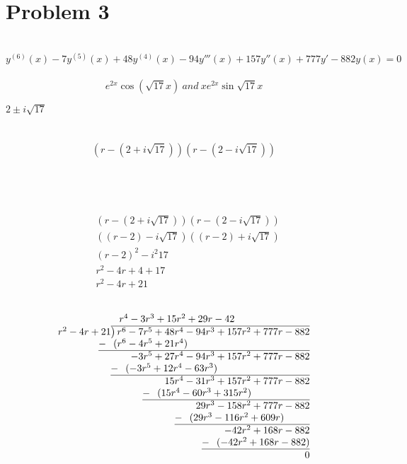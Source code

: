 \documentclass{article}
\begin{document}
    \newpage
    \section{Problem 3}
     \\
    $$y^{(6)}(x) -7y^{(5)}(x) + 48y^{(4)}(x) - 94y'''(x) + 157y''(x) + 777y' - 882y(x) = 0$$
     \\
    $$e^{2x}\cos(\sqrt{17}x)\ and\ xe^{2x}\sin{\sqrt{17}x}$$

    $2\pm i\sqrt{17}$
     \\ \\
     \\
    $$(r - (2 + i\sqrt{17}))(r - (2 - i\sqrt{17}))$$
     \\ \\ \\
     \\
    \begin{align*}
        &(r - (2 + i\sqrt{17}))(r - (2 - i\sqrt{17})) \\
        &((r - 2) - i\sqrt{17})((r - 2)+ i\sqrt{17}) \\
        &(r - 2)^{2} -i^{2}17\\
        &r^{2} - 4r + 4 + 17\\
        &r^{2} - 4r + 21\\
    \end{align*}
     \\
    \begin{align*}
        \begin{array}{r}
            r^{4} -3r^{3} + 15r^{2} + 29r - 42\phantom{)ddcddddddddddd} \\
            r^{2} - 4r + 21{\overline{\smash{\big)}\, r^{6}-7r^{5}+48r^{4}-94r^{3}+157r^{2}+777r-882}} \\
            \underline{-~\phantom{(}(r^{6} -4r^{5}+21r^{4})\phantom{-bbbbbbbbbbbbbbbbbbbbbbbbbb)}} \\
            -3r^{5} + 27r^{4} - 94r^{3} + 157r^{2} + 777r - 882 \phantom{}\\
            \underline{-~\phantom{(}(-3r^{5} + 12r^{4} - 63r^{3})\phantom{-bbbbbbbbbbbbbbbbbbb)}} \\
            15r^{4} - 31r^{3} + 157r^{2} + 777r - 882 \phantom{}\\
            \underline{-~\phantom{(}(15r^{4} - 60r^{3} + 315r^{2})\phantom{-bbbbbbbbbbb)}} \\
            29r^{3} - 158r^{2} + 777r - 882 \phantom{}\\
            \underline{-~\phantom{(}(29r^{3} - 116r^{2} + 609r)\phantom{-bdbb}} \\
            -42r^{2} + 168r - 882 \phantom{}\\
            \underline{-~\phantom{(}(-42r^{2} + 168r - 882)\phantom{}} \\
            0 \phantom{}\\
        \end{array}
    \end{align*}
\end{document}
